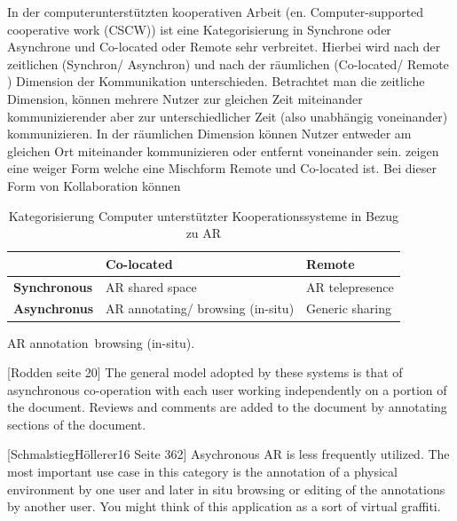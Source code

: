 \cite[p.~362]{DieterSchmalstieg2016}In der computerunterstützten kooperativen Arbeit (en. Computer-supported cooperative work (CSCW)) ist eine Kategorisierung in Synchrone oder Asynchrone und Co-located oder Remote sehr verbreitet. Hierbei wird nach der zeitlichen (Synchron/ Asynchron) und nach der räumlichen (Co-located/ Remote ) Dimension der Kommunikation unterschieden. Betrachtet man die zeitliche Dimension, können mehrere Nutzer zur gleichen Zeit miteinander kommunizierender aber zur unterschiedlicher Zeit (also unabhängig voneinander) kommunizieren. In der räumlichen Dimension können Nutzer entweder am gleichen Ort miteinander kommunizieren oder entfernt voneinander sein. \cite[p.~188]{ElSayedNevenA.M.BruceH.ThomasRossT.Smith2015} zeigen eine weiger Form welche eine Mischform Remote und Co-located ist. Bei dieser Form von Kollaboration können 

\begin{table}[htbp]
\caption{Kategorisierung Computer unterstützter Kooperationssysteme in Bezug zu AR}
	\begin{center}
		\begin{tabular}{|l|ll|}
		\hline
		 & \textbf{Co-located} & \textbf{Remote}\\
		\hline
		\textbf{Synchronous} &  AR shared space & AR telepresence \\
		\textbf{Asynchronus} & AR annotating/ browsing (in-situ) & Generic sharing\\
		\hline
		\end{tabular}
	\end{center}
	\label{tab:categorycscw}
\end{table}

AR annotation\ browsing (in-situ). %

[Rodden seite 20]
The general model adopted by these systems is that of asynchronous co-operation with each user working independently on a portion of the document. Reviews and comments are added to the document by annotating sections of the document. 

[SchmalstiegHöllerer16 Seite 362] Asychronous AR is less frequently utilized. The most important use case in this category is the annotation of a physical environment by one user and later in situ browsing or editing of the annotations by another user.
You might think of this application as a sort of virtual graffiti. 


